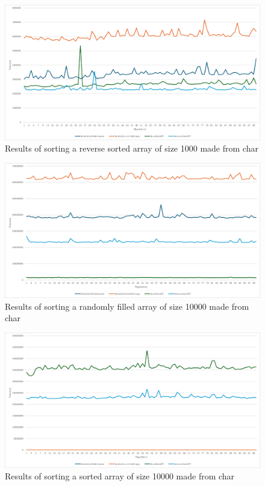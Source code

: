 \documentclass{article}
\begin{document}
    \begin{figure}[!h]
        \centering
        \includegraphics[width=0.7\linewidth]{char_1000_reverse_sorted.png}
        \caption{Results of sorting a reverse sorted array of size 1000 made from char}
        \label{fig:char_1000_reverse_sorted}
    \end{figure}
    
    \begin{figure}[!h]
        \centering
        \includegraphics[width=0.7\linewidth]{char_10000_random.png}
        \caption{Results of sorting a randomly filled array of size 10000 made from char}
        \label{fig:char_10000_random}
    \end{figure}
    
    \begin{figure}[!h]
        \centering
        \includegraphics[width=0.7\linewidth]{char_10000_sorted.png}
        \caption{Results of sorting a sorted array of size 10000 made from char}
        \label{fig:char_10000_sorted}
    \end{figure}
    
\end{document}
